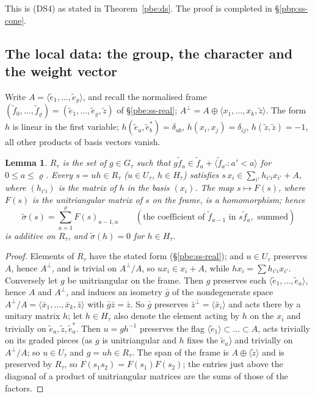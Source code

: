 \documentclass[10pt]{amsart}
\newtheorem{lemma}[theorem]{Lemma}
\theoremstyle{definition}
\theoremstyle{remark}
\begin{document}
This is \textup{(DS4)} as stated in Theorem~\ref{pbe:ds}. The proof is completed in
\S\ref{pbp:ss-cone}.

\subsection{The local data: the group, the character and the weight vector}\label{pbp:ss-data}

Write $A=\langle\tilde e_1,\dots,\tilde e_\varrho\rangle$, and recall the normalised frame
$(\tilde f_0,\dots,\tilde f_\varrho)=(\tilde e_1,\dots,\tilde e_\varrho,\tilde z)$ of
\S\ref{pbe:ss-real}; $A^\perp=A\oplus\langle x_1,\dots,x_k,\tilde z\rangle$. The form $h$ is linear
in the first variable; $h(\tilde e_a,\tilde e_b^*)=\delta_{ab}$, $h(x_i,x_j)=\delta_{ij}$,
$h(\tilde z,\tilde z)=-1$, all other products of basis vectors vanish.

\begin{lemma}\label{pbp:R}
$R_\tau$ is the set of $g\in G_\tau$ such that $g\tilde f_a\in\tilde f_a+\langle\tilde f_{a'}:a'<a
\rangle$ for $0\le a\le\varrho$. Every $s=uh\in R_\tau$ \textup($u\in U_\tau$, $h\in H_\tau$\textup)
satisfies $s\,x_i\in\sum_{i'}h_{i'i}x_{i'}+A$, where $(h_{i'i})$ is the matrix of $h$ in the basis
$(x_i)$. The map $s\mapsto F(s)$, where $F(s)$ is the unitriangular matrix of $s$ on the frame, is a
homomorphism; hence
\[
\tilde\sigma(s)=\sum_{a=1}^{\varrho}F(s)_{a-1,a}\qquad(\text{the coefficient of }\tilde f_{a-1}
\text{ in }s\tilde f_a,\text{ summed})
\]
is additive on $R_\tau$, and $\tilde\sigma(h)=0$ for $h\in H_\tau$.
\end{lemma}
\begin{proof}
Elements of $R_\tau$ have the stated form (\S\ref{pbe:ss-real}); and $u\in U_\tau$ preserves $A$, hence
$A^\perp$, and is trivial on $A^\perp/A$, so $ux_i\in x_i+A$, while $hx_i=\sum h_{i'i}x_{i'}$.
Conversely let $g$ be unitriangular on the frame. Then $g$ preserves each $\langle\tilde e_1,\dots,
\tilde e_a\rangle$, hence $A$ and $A^\perp$, and induces an isometry $\bar g$ of the nondegenerate
space $A^\perp/A=\langle\bar x_1,\dots,\bar x_k,\bar z\rangle$ with $\bar g\bar z=\bar z$. So $\bar g$
preserves $\bar z^\perp=\langle\bar x_i\rangle$ and acts there by a unitary matrix $h$; let $h\in
H_\tau$ also denote the element acting by $h$ on the $x_i$ and trivially on $\tilde e_a,\tilde z,
\tilde e_a^*$. Then $u=gh^{-1}$ preserves the flag $\langle\tilde e_1\rangle\subset\dots\subset A$, acts
trivially on its graded pieces (as $g$ is unitriangular and $h$ fixes the $\tilde e_a$) and trivially
on $A^\perp/A$; so $u\in U_\tau$ and $g=uh\in R_\tau$. The span of the frame is $A\oplus\langle\tilde z
\rangle$ and is preserved by $R_\tau$, so $F(s_1s_2)=F(s_1)F(s_2)$; the entries just above the
diagonal of a product of unitriangular matrices are the sums of those of the factors.
\end{proof}
\end{document}
